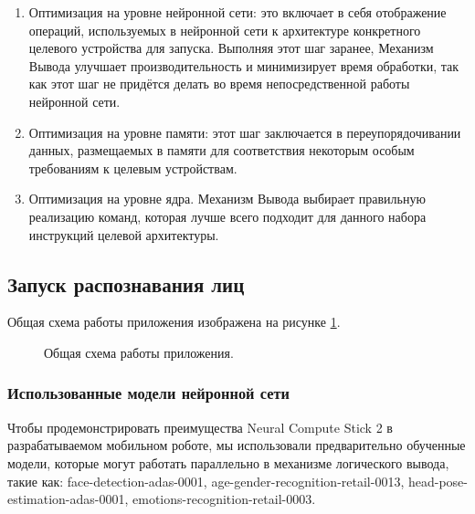 \documentclass[12pt,a4paper]{scrartcl}
\begin{document}
			\begin{enumerate}
				\item Оптимизация на уровне нейронной сети: это включает в себя отображение операций, используемых в нейронной сети к архитектуре конкретного целевого устройства для запуска. Выполняя этот шаг заранее, Механизм Вывода улучшает производительность и минимизирует время обработки, так как этот шаг не придётся делать во время непосредственной работы нейронной сети.
				\item Оптимизация на уровне памяти: этот шаг заключается в переупорядочивании данных, размещаемых в памяти для соответствия некоторым особым требованиям к целевым устройствам.
				\item Оптимизация на уровне ядра. Механизм Вывода выбирает правильную реализацию команд, которая лучше всего подходит для данного набора инструкций целевой архитектуры.
			\end{enumerate}	
	
	\subsection{Запуск распознавания лиц}
	
		Общая схема работы приложения изображена на рисунке \ref{fig:Integration_Process}\cite{bib:Integrate_IE_New_API}.
		
		\begin{figure}[h]
			\caption{Общая схема работы приложения.}
			\label{fig:Integration_Process}
		\end{figure}
	
		\subsubsection{Использованные модели нейронной сети}
		
			Чтобы продемонстрировать преимущества Neural Compute Stick 2 в разрабатываемом мобильном роботе, мы использовали предварительно обученные модели, которые могут работать параллельно в механизме логического вывода, такие как: face-detection-adas-0001, age-gender-recognition-retail-0013, head-pose-estimation-adas-0001, emotions-recognition-retail-0003.
			
\end{document}
